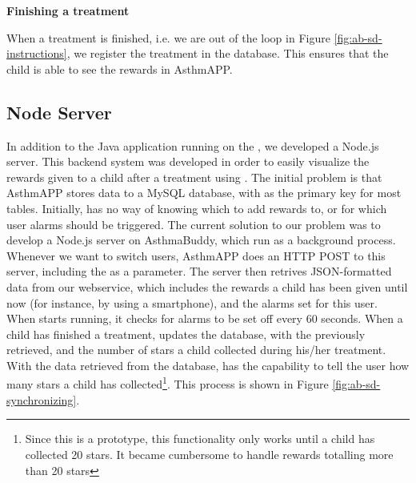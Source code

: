 \textbf{Finishing a treatment}

When a treatment is finished, i.e. we are out of the  loop in Figure \ref{fig:ab-sd-instructions}, we register the treatment in the database. This ensures that the child is able to see the rewards in AsthmAPP. 


\subsection{Node Server}
\label{sec:node-server}
In addition to the Java application running on the \rpi{}, we developed a Node.js server. This backend system was developed in order to easily visualize the rewards given to a child after a treatment using \buddy{}. The initial problem is that AsthmAPP stores data to a MySQL database, with  as the primary key for most tables. Initially, \buddy{} has no way of knowing which  to add rewards to, or for which user alarms should be triggered. The current solution to our problem was to develop a Node.js server on AsthmaBuddy, which run as a background process. Whenever we want to switch users, AsthmAPP does an HTTP POST to this server, including the  as a parameter. The server then retrives JSON-formatted data from our webservice, which includes the rewards a child has been given until now (for instance, by using a smartphone), and the alarms set for this user. 
When \buddy{} starts running, it checks for alarms to be set off every 60 seconds. When a child has finished a treatment,  updates the database, with the  previously retrieved, and the number of stars a child collected during his/her treatment. With the data retrieved from the database, \buddy{} has the capability to tell the user how many stars a child has collected\footnote{Since this is a prototype, this functionality only works until a child has collected 20 stars. It became cumbersome to handle rewards totalling more than 20 stars}. This process is shown in Figure \ref{fig:ab-sd-synchronizing}.

